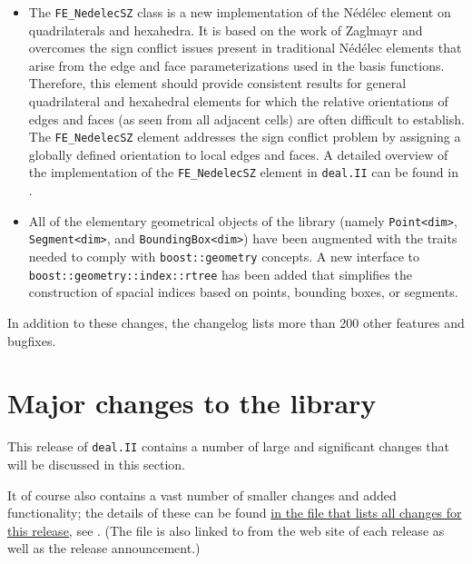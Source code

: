 \documentclass{ansarticle-preprint}
\newcommand{\specialword}[1]{\texttt{#1}}
\newcommand{\dealii}{{\specialword{deal.II}}\xspace}
\begin{document}
\begin{itemize}
\item
  The \texttt{FE\_NedelecSZ} class is a new implementation of the
  N{\'e}d{\'e}lec element on quadrilaterals and hexahedra. It is based on
  the work of Zaglmayr \cite{Zag06} and overcomes the sign conflict issues
  present in traditional N{\'e}d{\'e}lec elements that arise from the edge
  and face parameterizations used in the basis functions. Therefore, this
  element should provide consistent results for general quadrilateral and
  hexahedral elements for which the relative orientations of edges and
  faces (as seen from all adjacent cells) are often difficult to establish.
  The \texttt{FE\_NedelecSZ} element addresses the sign conflict problem by
  assigning a globally defined orientation to local edges and faces. A
  detailed overview of the implementation of the \texttt{FE\_NedelecSZ}
  element in \dealii{} can be found in \cite{Kynch2017}.

\item All of the elementary geometrical objects of the library (namely
  \texttt{Point<dim>}, \texttt{Segment<dim>}, and
  \texttt{BoundingBox<dim>}) have been augmented with the traits
  needed to comply with \texttt{boost::geometry} concepts. A new
  interface to \texttt{boost::geometry::index::rtree} has been added
  that simplifies the construction of spacial indices based on points,
  bounding boxes, or segments.
\end{itemize}
%
In addition to these changes, the changelog lists more than 200 other
features and bugfixes.




\section{Major changes to the library}
\label{sec:major}

This release of \dealii contains a number of large and significant changes
that will be discussed in this section.

It of course also contains a
vast number of smaller changes and added functionality; the details of these
can be found
\href{https://dealii.org/developer/doxygen/deal.II/changes_between_9_0_1_and_9_1_0.html}{
in the file that lists all changes for this release}, see \cite{changes91}.
(The file is also linked to from the web site of each release as well as
the release announcement.)
\end{document}
